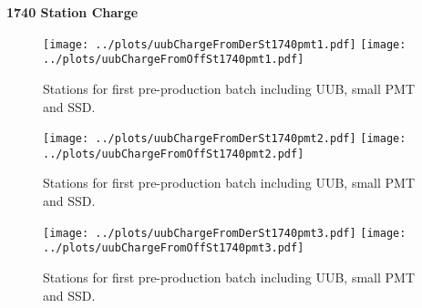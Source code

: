 \documentclass[twoside, final, 10pt]{articleMine}
\begin{document}
{\bf 1740 Station Charge}
\begin{figure}[!tbh]
  \centering
  \subfigure
  {
    \texttt{[image: ../plots/uubChargeFromDerSt1740pmt1.pdf]}
    \texttt{[image: ../plots/uubChargeFromOffSt1740pmt1.pdf]}
  }
  \caption{Stations for first pre-production batch including UUB, small PMT and SSD.}
  \label{figChLowHigh}
\end{figure}

\begin{figure}[!tbh]
  \centering
  \subfigure
  {
    \texttt{[image: ../plots/uubChargeFromDerSt1740pmt2.pdf]}
    \texttt{[image: ../plots/uubChargeFromOffSt1740pmt2.pdf]}
  }
  \caption{Stations for first pre-production batch including UUB, small PMT and SSD.}
  \label{figChLowHigh}
\end{figure}

\begin{figure}[!tbh]
  \centering
  \subfigure
  {
    \texttt{[image: ../plots/uubChargeFromDerSt1740pmt3.pdf]}
    \texttt{[image: ../plots/uubChargeFromOffSt1740pmt3.pdf]}
  }
  \caption{Stations for first pre-production batch including UUB, small PMT and SSD.}
  \label{figChLowHigh}
\end{figure}
\clearpage
\end{document}

